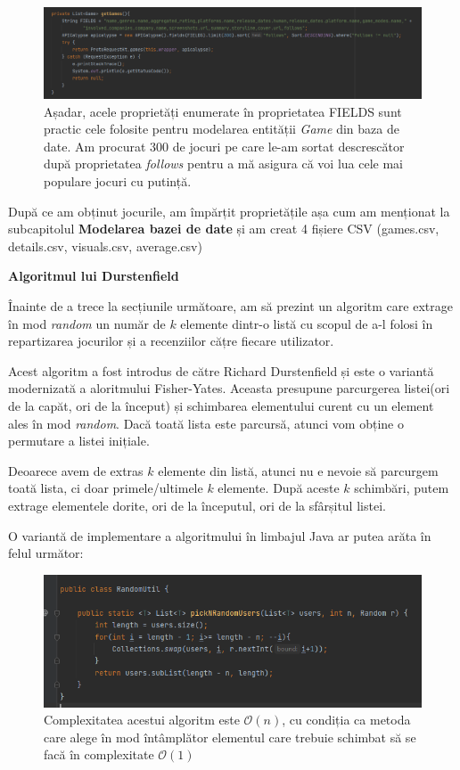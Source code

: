\documentclass[12pt,a4paper]{report}
\begin{document}
\begin{figure}[H]
\centering
\caption{}
\includegraphics[scale = 0.6]{exemplu_10_games}
\caption*{Așadar, acele proprietăți enumerate în proprietatea FIELDS sunt practic cele folosite pentru modelarea entității \emph{Game} din baza de date. Am procurat 300 de jocuri pe care le-am sortat descrescător după proprietatea \emph{follows} pentru a mă asigura că voi lua cele mai populare jocuri cu putință. }
\end{figure}

După ce am obținut jocurile, am împărțit proprietățile așa cum am menționat la subcapitolul \textbf{Modelarea bazei de date} și am creat 4 fișiere CSV (games.csv, details.csv, visuals.csv, average.csv)

\bigskip
\textbf{Algoritmul lui Durstenfield}
\bigskip

Înainte de a trece la secțiunile următoare, am să prezint un algoritm care extrage în mod \emph{random} un număr de \( k\) elemente dintr-o listă cu scopul de a-l folosi în repartizarea jocurilor și a recenziilor cățre fiecare utilizator.

Acest algoritm a fost introdus de către Richard Durstenfield și este o variantă modernizată a aloritmului Fisher-Yates. \cite{16} Aceasta presupune parcurgerea listei(ori de la capăt, ori de la început) și schimbarea elementului curent cu un element ales în mod \emph{random}. Dacă toată lista este parcursă, atunci vom obține o permutare a listei inițiale.

Deoarece avem de extras \( k \) elemente din listă, atunci nu e nevoie să parcurgem toată lista, ci doar primele/ultimele \( k \) elemente. După aceste \( k \) schimbări, putem extrage elementele dorite, ori de la începutul, ori de la sfârșitul listei.

O variantă de implementare a algoritmului în limbajul Java ar putea arăta în felul următor:

\begin{figure}[H]
\centering
\caption{}
\includegraphics[scale = 0.8]{exemplu_11_random}
\caption*{Complexitatea acestui algoritm este \(\mathcal{O}(n) \), cu condiția ca metoda care alege în mod întâmplător elementul care trebuie schimbat să se facă în complexitate \(\mathcal{O}(1) \) }
\end{figure}
\end{document}

